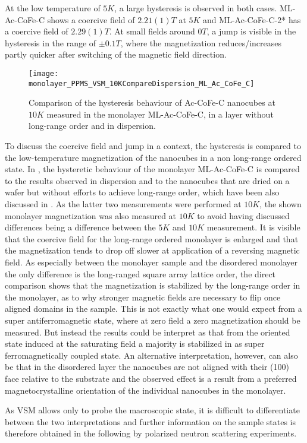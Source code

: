 \documentclass[\main/dresen_thesis.tex]{subfiles}
\begin{document}
  At the low temperature of $5 \unit{K}$, a large hysteresis is observed in both cases.
  ML-Ac-CoFe-C shows a coercive field of $2.21(1) \unit{T}$ at $5 \unit{K}$ and ML-Ac-CoFe-C-2* has a coercive field of $2.29(1) \unit{T}$.
  At small fields around $0 \unit{T}$, a jump is visible in the hysteresis in the range of $\pm 0.1 \unit{T}$, where the magnetization reduces/increases partly quicker after switching of the magnetic field direction.

  \begin{figure}[tb]
    \centering
    \texttt{[image: monolayer\_PPMS\_VSM\_10KCompareDispersion\_ML\_Ac\_CoFe\_C]}
    \caption{\label{fig:monolayer:magneticStructure:MLAcCoFeCCompareDispWafer}Comparison of the hysteresis behaviour of Ac-CoFe-C nanocubes at $10 \unit{K}$ measured in the monolayer ML-Ac-CoFe-C, in a layer without long-range order and in dispersion.}
  \end{figure}

  To discuss the coercive field and jump in a context, the hysteresis is compared to the low-temperature magnetization of the nanocubes in a non long-range ordered state.
  In , the hysteretic behaviour of the monolayer ML-Ac-CoFe-C is compared to the results observed in dispersion and to the nanocubes that are dried on a wafer but without efforts to achieve long-range order, which have been also discussed in .
  As the latter two measurements were performed at $10 \unit{K}$, the shown monolayer magnetization was also measured at $10 \unit{K}$ to avoid having discussed differences being a difference between the $5 \unit{K}$ and $10 \unit{K}$ measurement.
  It is visible that the coercive field for the long-range ordered monolayer is enlarged and that the magnetization tends to drop off slower at application of a reversing magnetic field.
  As especially between the monolayer sample and the disordered monolayer the only difference is the long-ranged square array lattice order, the direct comparison shows that the magnetization is stabilized by the long-range order in the monolayer, as to why stronger magnetic fields are necessary to flip once aligned domains in the sample.
  This is not exactly what one would expect from a super antiferromagnetic state, where at zero field a zero magnetization should be measured.
  But instead the results could be interpret as that from the oriented state induced at the saturating field a majority is stabilized in as super ferromagnetically coupled state.
  An alternative interpretation, however, can also be that in the disordered layer the nanocubes are not aligned with their (100) face relative to the substrate and the observed effect is a result from a preferred magnetocrystalline orientation of the individual nanocubes in the monolayer.

  As VSM allows only to probe the macroscopic state, it is difficult to differentiate between the two interpretations and further information on the sample states is therefore obtained in the following by polarized neutron scattering experiments.
\end{document}
